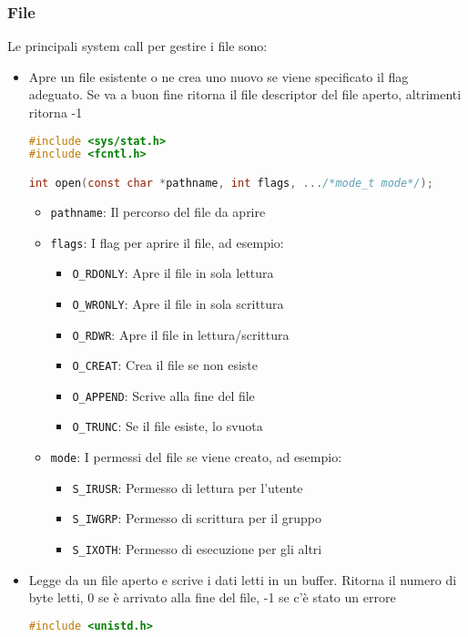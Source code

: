 \documentclass[a4paper]{article}
\begin{document}
\subsubsection{File}
Le principali system call per gestire i file sono:
\begin{itemize}
\item Apre un file esistente o ne crea uno nuovo se viene specificato il flag adeguato.
  Se va a buon fine ritorna il file descriptor del file aperto, altrimenti ritorna -1
\begin{lstlisting}[language=C]
#include <sys/stat.h>
#include <fcntl.h>

int open(const char *pathname, int flags, .../*mode_t mode*/);
\end{lstlisting}
  \begin{itemize}
    \item \texttt{pathname}: Il percorso del file da aprire
    \item \texttt{flags}: I flag per aprire il file, ad esempio:
      \begin{itemize}
        \item \texttt{O\_RDONLY}: Apre il file in sola lettura
        \item \texttt{O\_WRONLY}: Apre il file in sola scrittura
        \item \texttt{O\_RDWR}: Apre il file in lettura/scrittura
        \item \texttt{O\_CREAT}: Crea il file se non esiste
        \item \texttt{O\_APPEND}: Scrive alla fine del file
        \item \texttt{O\_TRUNC}: Se il file esiste, lo svuota
      \end{itemize}
    \item \texttt{mode}: I permessi del file se viene creato, ad esempio:
      \begin{itemize}
        \item \texttt{S\_IRUSR}: Permesso di lettura per l'utente
        \item \texttt{S\_IWGRP}: Permesso di scrittura per il gruppo
        \item \texttt{S\_IXOTH}: Permesso di esecuzione per gli altri
      \end{itemize}
  \end{itemize}

\item Legge da un file aperto e scrive i dati letti in un buffer. Ritorna il numero
  di byte letti, 0 se è arrivato alla fine del file, -1 se c'è stato un errore
\begin{lstlisting}[language=C]
#include <unistd.h>


\end{lstlisting}
\end{itemize}
\end{document}
